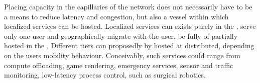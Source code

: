 Placing capacity in the capillaries of the network does not necessarily have to be a means to reduce latency and congestion, but also a vessel within which localized services can be hosted. Localized services can exists purely in the \xcloud, serve only one user and geographically migrate with the user, be fully of partially hosted in the \xcloud. Different tiers can proposedly by hosted at distributed, depending on the users mobility behaviour. Conceivably, such services could range from compute offloading, game rendering, emergency services, sensor and traffic monitoring, low-latency process control, such as surgical robotics.